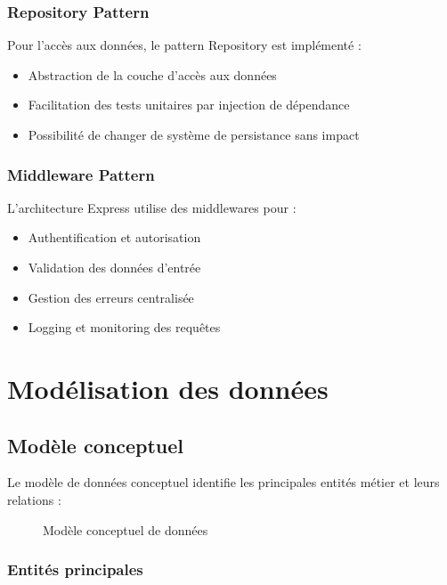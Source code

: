 \subsubsection{Repository Pattern}

Pour l'accès aux données, le pattern Repository est implémenté :

\begin{itemize}
\item Abstraction de la couche d'accès aux données
\item Facilitation des tests unitaires par injection de dépendance
\item Possibilité de changer de système de persistance sans impact
\end{itemize}

\subsubsection{Middleware Pattern}

L'architecture Express utilise des middlewares pour :

\begin{itemize}
\item Authentification et autorisation
\item Validation des données d'entrée
\item Gestion des erreurs centralisée
\item Logging et monitoring des requêtes
\end{itemize}

\section{Modélisation des données}

\subsection{Modèle conceptuel}

Le modèle de données conceptuel identifie les principales entités métier et leurs relations :

\begin{figure}[H]
\centering
\caption{Modèle conceptuel de données}
\label{fig:modele-conceptuel}
\end{figure}

\subsubsection{Entités principales}

